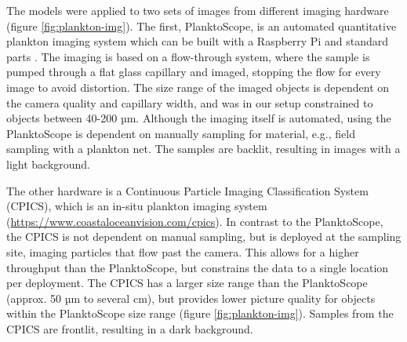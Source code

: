 The models were applied to two sets of images from different imaging hardware (figure \ref{fig:plankton-img}). The first, PlanktoScope, is an automated quantitative plankton imaging system which can be built with a Raspberry Pi and standard parts \cite{pollina2022:planktoscope}. The imaging is based on a flow-through system, where the sample is pumped through a flat glass capillary and imaged, stopping the flow for every image to avoid distortion. The size range of the imaged objects is dependent on the camera quality and capillary width, and was in our setup constrained to objects between 40-200 µm. Although the imaging itself is automated, using the PlanktoScope is dependent on manually sampling for material, e.g., field sampling with a plankton net. The samples are backlit, resulting in images with a light background.

The other hardware is a Continuous Particle Imaging Classification System (CPICS), which is an in-situ plankton imaging system (\hyperlink{https://www.coastaloceanvision.com/cpics}{https://www.coastaloceanvision.com/cpics}). In contrast to the PlanktoScope, the CPICS is not dependent on manual sampling, but is deployed at the sampling site, imaging particles that flow past the camera. This allows for a higher throughput than the PlanktoScope, but constrains the data to a single location per deployment. The CPICS has a larger size range than the PlanktoScope (approx. 50 µm to several cm), but provides lower picture quality for objects within the PlanktoScope size range (figure \ref{fig:plankton-img}). Samples from the CPICS are frontlit, resulting in a dark background.


